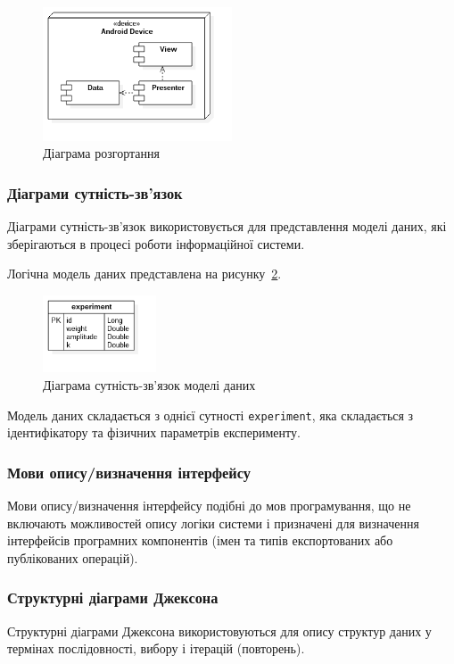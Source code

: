 \begin{figure}[H]
  \centering
    \includegraphics[width=0.5\textwidth]{uml_deployment}
  \caption{Діаграма розгортання}
  \label{fig:uml_deployment}
\end{figure}

\subsubsection{Діаграми сутність-зв’язок}
Діаграми сутність-зв’язок використовується для представлення моделі даних, які зберігаються в процесі роботи інформаційної системи.

Логічна модель даних представлена на рисунку~\ref{fig:erd}.

\begin{figure}[H]
  \centering
    \includegraphics[width=0.3\textwidth]{erd}
  \caption{Діаграма сутність-зв’язок моделі даних}
  \label{fig:erd}
\end{figure}

Модель даних складається з однієї сутності \texttt{experiment}, яка складається з ідентифікатору та фізичних параметрів експерименту.

\subsubsection{Мови опису/визначення інтерфейсу}
Мови опису/визначення інтерфейсу подібні до мов програмування, що не включають можливостей опису логіки системи і призначені для визначення інтерфейсів програмних компонентів (імен та типів експортованих або публікованих операцій).

\subsubsection{Структурні діаграми Джексона}
Структурні діаграми Джексона використовуються для опису структур даних у термінах послідовності, вибору і ітерацій (повторень).

